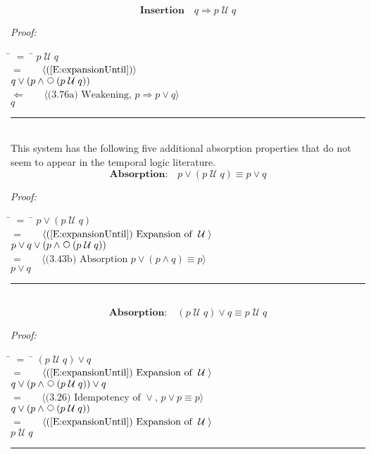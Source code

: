 \documentclass[fleqn, leqno]{article}
\newcommand{\lgap}{2pt}                             %
\newcommand{\mymathindent}{24pt}                    %
\newcommand{\impl}{\ensuremath{\Rightarrow}}        %
\newcommand{\foll}{\ensuremath{\Leftarrow}}         %
\newcommand{\Until}{\;\mathcal{U}\;}
\newcommand{\Next}{\;\,\text{\raisebox{3.5pt}{\circle{6}}}}
\newcommand{\myqed}{\hfill\rule[-.23ex]{1.2ex}{2.0ex}}
\newcommand{\Gll} {\langle}                         %
\newcommand{\Ggg} {\rangle}                         %
\newcommand{\Hint}[1]     {\ \ \ $\Gll              \mbox{#1} \Ggg$ }   %
\begin{document}

\begin{equation}\label{E:untilInsertion}
\textbf{Insertion}\quad q \impl p \Until q
\end{equation}

\emph{Proof:}
\begin{tabbing}
\hspace{\mymathindent} \= $= \;$ \= \kill
\> \> $p \Until q$\\[\lgap]
\> $=$ \> \Hint{(\ref{E:expansionUntil})} \\[\lgap]
\> \> $q \lor (p \land \Next(p \Until q))$\\[\lgap]
\> $\foll$ \> \Hint{(3.76a) Weakening, $p\impl p\lor q$} \\[\lgap]
\> \> $q$\\[\lgap]
\end{tabbing}
\myqed\\[\lgap]

This system has the following five additional absorption properties that do not seem to
appear in the temporal logic literature.
\begin{equation}\label{E:untilOrP}
\textbf{Absorption:}\quad p \lor (p \Until q) \equiv p \lor q
\end{equation}

\emph{Proof:}
\begin{tabbing}
\hspace{\mymathindent} \= $= \;$ \= \kill
  \> \>   $p \lor (p \Until q)$\\[\lgap]
  \> $=$  \>  \Hint{(\ref{E:expansionUntil}) Expansion of $\Until$}\\[\lgap]
  \> \>   $p \lor q \lor (p \land \Next(p \Until q))$\\[\lgap]
  \> $=$  \>  \Hint{(3.43b) Absorption $p \lor (p \land q) \equiv p$}\\[\lgap]
  \> \>   $p \lor q$
\end{tabbing}
\myqed\\[\lgap]

\begin{equation}\label{E:untilOrQ}
\textbf{Absorption:}\quad (p \Until q) \lor q \equiv p \Until q
\end{equation}

\emph{Proof:}
\begin{tabbing}
\hspace{\mymathindent} \= $= \;$ \= \kill
  \> \>   $(p \Until q) \lor q$\\[\lgap]
  \> $=$  \>  \Hint{(\ref{E:expansionUntil}) Expansion of $\Until$}\\[\lgap]
  \> \>   $q \lor (p \land \Next(p \Until q)) \lor q$\\[\lgap]
  \> $=$  \>  \Hint{(3.26) Idempotency of $\lor$, $p \lor p \equiv p$}\\[\lgap]
  \> \>   $q \lor (p \land \Next(p \Until q))$\\[\lgap]
  \> $=$  \>  \Hint{(\ref{E:expansionUntil}) Expansion of $\Until$}\\[\lgap]
  \> \>   $p \Until q$
\end{tabbing}
\myqed\\[\lgap]
\end{document}
